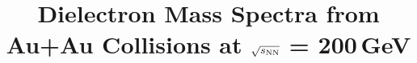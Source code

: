 \documentclass[twocolumn,showpacs,amsmath,amssymb,superscriptaddress,nofootinbib]{revtex4-1}
\newcommand{\sNN}{$\sqrt{s_{\rm NN}}$ }
\begin{document}
\def\Journal#1#2#3#4{{#1} {\bf #2}, #3 (#4)}

\def\NCA{Nuovo Cimento}
\def\NIM{Nucl. Instr. Meth.}
\def\NIMA{{Nucl. Instr. Meth.} A}
\def\NPB{{Nucl. Phys.} B}
\def\NPA{{Nucl. Phys.} A}
\def\PLB{{Phys. Lett.}  B}
\def\PRL{{Phys. Rev. Lett.}}
\def\PRC{{Phys. Rev.} C}
\def\PRD{{Phys. Rev.} D}
\def\ZPC{{Z. Phys.} C}
\def\JPG{{J. Phys.} G}
\def\EPJ{{Eur. Phys. J.} C}
\def\EPJA{{Eur. Phys. J.} A}
\def\EPJST{{Eur. Phys. J.} - Special Topics}
\def\RPP{{Rep. Prog. Phys.}}
\def\PR{{Phys. Rep.}}
\def\ANP{{Adv. Nucl. Phys.}}



\title{Dielectron Mass Spectra from Au+Au Collisions at \sNN = 200\,GeV}
\end{document}
